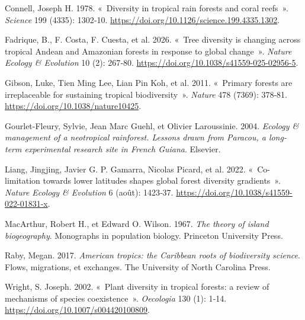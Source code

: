 \documentclass[
  french,
  11pt,
]{stylisharticle}
\newlength{\cslhangindent}
\newenvironment{CSLReferences}[2] %
 {\begin{list}{}{%
  \setlength{\itemindent}{0pt}
  \setlength{\leftmargin}{0pt}
  \setlength{\parsep}{0pt}
  \ifodd #1
   \setlength{\leftmargin}{\cslhangindent}
   \setlength{\itemindent}{-1\cslhangindent}
  \fi
  \setlength{\itemsep}{#2\baselineskip}}}
 {\end{list}}
\begin{document}
\protect{}\label{refs}
\begin{CSLReferences}{1}{1}
Connell, Joseph H. 1978. {«~Diversity in tropical rain forests and coral
reefs~»}. \emph{Science} 199 (4335): 1302‑10.
\url{https://doi.org/10.1126/science.199.4335.1302}.

{Fadrique, B., F. Costa, F. Cuesta, et al.} 2026. {«~Tree diversity is
changing across tropical Andean and Amazonian forests in response to
global change~»}. \emph{Nature Ecology \& Evolution} 10 (2): 267‑80.
\url{https://doi.org/10.1038/s41559-025-02956-5}.

{Gibson, Luke, Tien Ming Lee, Lian Pin Koh, et al.} 2011. {«~Primary
forests are irreplaceable for sustaining tropical biodiversity~»}.
\emph{Nature} 478 (7369): 378‑81.
\url{https://doi.org/10.1038/nature10425}.

Gourlet-Fleury, Sylvie, Jean Marc Guehl, et Olivier Laroussinie. 2004.
\emph{Ecology \& management of a neotropical rainforest. Lessons drawn
from Paracou, a long-term experimental research site in French Guiana}.
Elsevier.

{Liang, Jingjing, Javier G. P. Gamarra, Nicolas Picard, et al.} 2022.
{«~Co-limitation towards lower latitudes shapes global forest diversity
gradients~»}. \emph{Nature Ecology \& Evolution} 6 (août): 1423‑37.
\url{https://doi.org/10.1038/s41559-022-01831-x}.

MacArthur, Robert H., et Edward O. Wilson. 1967. \emph{The theory of
island biogeography}. Monographs in population biology. Princeton
University Press.

Raby, Megan. 2017. \emph{American tropics: the Caribbean roots of
biodiversity science}. Flows, migrations, et exchanges. The University
of North Carolina Press.

Wright, S. Joseph. 2002. {«~Plant diversity in tropical forests: a
review of mechanisms of species coexistence~»}. \emph{Oecologia} 130
(1): 1‑14. \url{https://doi.org/10.1007/s004420100809}.

\end{CSLReferences}
\end{document}
